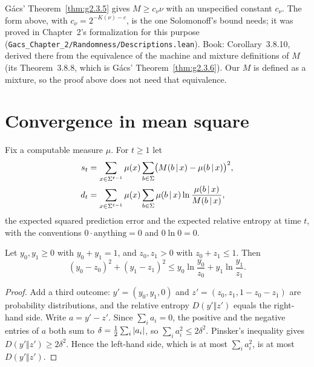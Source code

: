 \begin{formalization}
G\'acs' Theorem~\ref{thm:g2.3.5} gives \( M \ge c_{\nu}\nu \) with an unspecified constant
\( c_{\nu} \). The form above, with \( c_{\nu} = 2^{-K(\nu)-c} \), is the one Solomonoff's
bound needs; it was proved in Chapter~2's formalization for this purpose
(\texttt{Gacs\_Chapter\_2/Randomness/Descriptions.lean}). Book: Corollary~3.8.10, derived
there from the equivalence of the machine and mixture definitions of \( M \) (its
Theorem~3.8.8, which is G\'acs' Theorem~\ref{thm:g2.3.6}). Our \( M \) is defined as a
mixture, so the proof above does not need that equivalence.
\end{formalization}

\section{Convergence in mean square}

Fix a computable measure \( \mu \). For \( t \ge 1 \) let
 \begin{align*}
  s_{t} &= \sum_{x \in \Sigma^{t-1}} \mu(x) \sum_{b \in \Sigma}
           \bigl(M(b \,\vert\, x) - \mu(b \,\vert\, x)\bigr)^{2},
\\ d_{t} &= \sum_{x \in \Sigma^{t-1}} \mu(x) \sum_{b \in \Sigma}
           \mu(b \,\vert\, x) \ln\frac{\mu(b \,\vert\, x)}{M(b \,\vert\, x)},
 \end{align*}
the expected squared prediction error and the expected relative entropy at time \( t \),
with the conventions \( 0 \cdot \text{anything} = 0 \) and \( 0 \ln 0 = 0 \).

\begin{lemma}\label{lem:sol-entropy-ineq}
Let \( y_{0}, y_{1} \ge 0 \) with \( y_{0} + y_{1} = 1 \), and \( z_{0}, z_{1} > 0 \) with
\( z_{0} + z_{1} \le 1 \). Then
 \[
   (y_{0} - z_{0})^{2} + (y_{1} - z_{1})^{2}
   \le y_{0} \ln\frac{y_{0}}{z_{0}} + y_{1} \ln\frac{y_{1}}{z_{1}}.
 \]
\end{lemma}
\begin{proof}
Add a third outcome: \( y' = (y_{0}, y_{1}, 0) \) and
\( z' = (z_{0}, z_{1}, 1 - z_{0} - z_{1}) \) are probability distributions, and the
relative entropy \( D(y' \Vert z') \) equals the right-hand side. Write
\( a = y' - z' \). Since \( \sum_{i} a_{i} = 0 \), the positive and the negative entries of
\( a \) both sum to \( \delta = \frac12 \sum_{i} |a_{i}| \), so
\( \sum_{i} a_{i}^{2} \le 2\delta^{2} \). Pinsker's inequality gives
\( D(y' \Vert z') \ge 2\delta^{2} \). Hence the left-hand side, which is at most
\( \sum_{i} a_{i}^{2} \), is at most \( D(y' \Vert z') \).
\end{proof}

